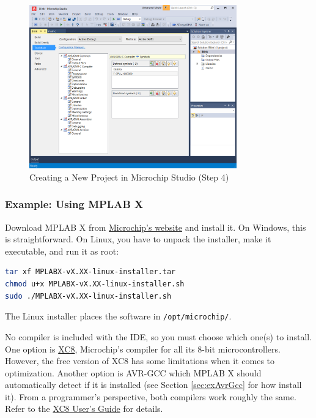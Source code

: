 \documentclass{article}
\newcommand{\file}[1]{\texttt{#1}}
\begin{document}
\begin{figure}[htb]
\centering
\includegraphics[width=0.8\textwidth]{Pictures/MchpStudio4.png}
\caption{Creating a New Project in Microchip Studio (Step 4)}
\label{fig:mchpStudio4}
\end{figure}
\FloatBarrier

\subsubsection{Example: Using MPLAB X}\label{sec:exMplabx}
Download MPLAB X from \href{https://www.microchip.com/en-us/tools-resources/develop/mplab-x-ide}{Microchip's website} and install it. On Windows, this is straightforward. On Linux, you have to unpack the installer, make it executable, and run it as root:
\begin{lstlisting}[language=bash]
tar xf MPLABX-vX.XX-linux-installer.tar
chmod u+x MPLABX-vX.XX-linux-installer.sh
sudo ./MPLABX-vX.XX-linux-installer.sh
\end{lstlisting}
The Linux installer places the software in \file{/opt/microchip/}. 

No compiler is included with the IDE, so you must choose which one(s) to install. One option is \href{https://www.microchip.com/en-us/tools-resources/develop/mplab-xc-compilers/xc8}{XC8}, Microchip's compiler for all its 8-bit microcontrollers. However, the free version of XC8 has some limitations when it comes to optimization. Another option is AVR-GCC which MPLAB X should automatically detect if it is installed (see Section \ref{sec:exAvrGcc} for how install it). From a programmer's perspective, both compilers work roughly the same. Refer to the \href{https://ww1.microchip.com/downloads/en/devicedoc/50002053g.pdf}{XC8 User's Guide} for details. 
\end{document}
